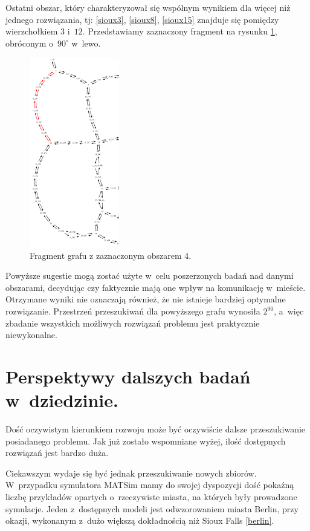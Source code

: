 \documentclass[twoside,12pt]{report}
\begin{document}
Ostatni obszar, który charakteryzował się wspólnym wynikiem dla więcej niż jednego rozwiązania, tj: \ref{sioux3}, \ref{sioux8}, \ref{sioux15} znajduje się pomiędzy wierzchołkiem $3$ i~$12$. Przedstawiamy zaznaczony fragment na rysunku \ref{frag_4}, obróconym o~$90^{\circ}$ w~lewo.

\begin{figure}[ht]
\centering
\includegraphics[width=0.35\textwidth, angle=90]{img/sioux-out/obszar4}
\caption{Fragment grafu z zaznaczonym obszarem 4.}
\label{frag_4}
\end{figure}

Powyższe sugestie mogą zostać użyte w~celu poszerzonych badań nad danymi obszarami, decydując czy faktycznie mają one wpływ na komunikację w~mieście. Otrzymane wyniki nie oznaczają również, że nie istnieje bardziej optymalne rozwiązanie. Przestrzeń przeszukiwań dla powyższego grafu wynosiła $2^{90}$, a~więc zbadanie wszystkich możliwych rozwiązań problemu jest praktycznie niewykonalne.

\clearpage
\section{Perspektywy dalszych badań w~dziedzinie.}
Dość oczywistym kierunkiem rozwoju może być oczywiście dalsze przeszukiwanie posiadanego problemu. Jak już zostało wspomniane wyżej, ilość dostępnych rozwiązań jest bardzo duża.

Ciekawszym wydaje się być jednak przeszukiwanie nowych zbiorów. W~przypadku symulatora MATSim mamy do swojej dyspozycji dość pokaźną liczbę przykładów opartych o~rzeczywiste miasta, na których były prowadzone symulacje. Jeden z~dostępnych modeli jest odwzorowaniem miasta Berlin, przy okazji, wykonanym z~dużo większą dokładnością niż Sioux Falls \ref{berlin}.
\end{document}
